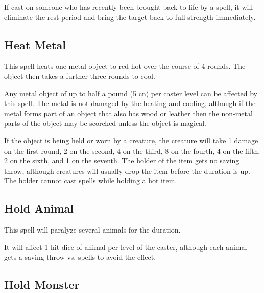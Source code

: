 \begin{multicols*}{2}
If cast on someone who has recently been brought back to life by a  spell, it will eliminate the rest period and bring the target back to full strength immediately.

\subsection{Heat Metal}\label{spell:Heat Metal}

This spell heats one metal object to red-hot over the course of 4 rounds. The object then takes a further three rounds to cool.

Any metal object of up to half a pound (5 cn) per caster level can be affected by this spell. The metal is not damaged by the heating and cooling, although if the metal forms part of an object that also has wood or leather then the non-metal parts of the object may be scorched unless the object is magical.

If the object is being held or worn by a creature, the creature will take 1 damage on the first round, 2 on the second, 4 on the third, 8 on the fourth, 4 on the fifth, 2 on the sixth, and 1 on the seventh. The holder of the item gets no saving throw, although creatures will usually drop the item before the duration is up. The holder cannot cast spells while holding a hot item.

\subsection{Hold Animal}\label{spell:Hold Animal}

This spell will paralyze several animals for the duration.

It will affect 1 hit dice of animal per level of the caster, although each animal gets a saving throw vs. spells to avoid the effect.

\subsection{Hold Monster}\label{spell:Hold Monster}
\end{multicols*}

